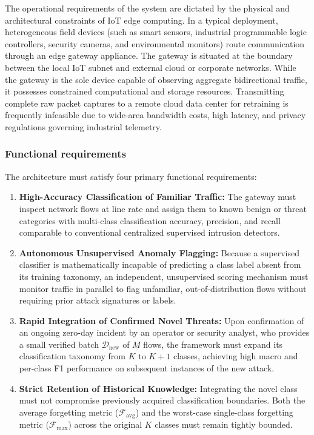 The operational requirements of the system are dictated by the physical and architectural constraints of IoT edge computing. In a typical deployment, heterogeneous field devices (such as smart sensors, industrial programmable logic controllers, security cameras, and environmental monitors) route communication through an edge gateway appliance. The gateway is situated at the boundary between the local IoT subnet and external cloud or corporate networks. While the gateway is the sole device capable of observing aggregate bidirectional traffic, it possesses constrained computational and storage resources. Transmitting complete raw packet captures to a remote cloud data center for retraining is frequently infeasible due to wide-area bandwidth costs, high latency, and privacy regulations governing industrial telemetry.

\subsubsection{Functional requirements}
The architecture must satisfy four primary functional requirements:
\begin{enumerate}
    \item[\textbf{R1.}] \textbf{High-Accuracy Classification of Familiar Traffic:} The gateway must inspect network flows at line rate and assign them to known benign or threat categories with multi-class classification accuracy, precision, and recall comparable to conventional centralized supervised intrusion detectors.
    \item[\textbf{R2.}] \textbf{Autonomous Unsupervised Anomaly Flagging:} Because a supervised classifier is mathematically incapable of predicting a class label absent from its training taxonomy, an independent, unsupervised scoring mechanism must monitor traffic in parallel to flag unfamiliar, out-of-distribution flows without requiring prior attack signatures or labels.
    \item[\textbf{R3.}] \textbf{Rapid Integration of Confirmed Novel Threats:} Upon confirmation of an ongoing zero-day incident by an operator or security analyst, who provides a small verified batch $\mathcal{D}_{\text{new}}$ of $M$ flows, the framework must expand its classification taxonomy from $K$ to $K+1$ classes, achieving high macro and per-class F1 performance on subsequent instances of the new attack.
    \item[\textbf{R4.}] \textbf{Strict Retention of Historical Knowledge:} Integrating the novel class must not compromise previously acquired classification boundaries. Both the average forgetting metric ($\mathcal{F}_{\text{avg}}$) and the worst-case single-class forgetting metric ($\mathcal{F}_{\max}$) across the original $K$ classes must remain tightly bounded.
\end{enumerate}

